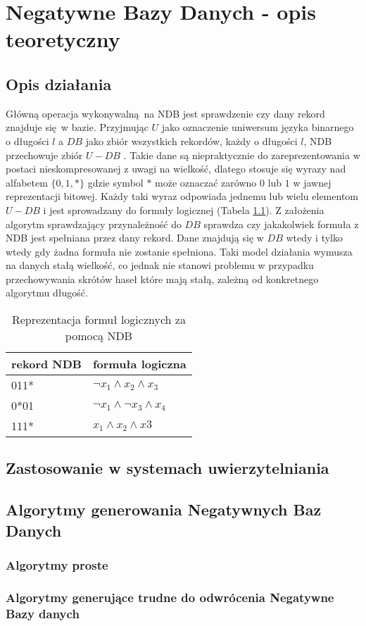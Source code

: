 \chapter{Negatywne Bazy Danych - opis teoretyczny}
\section{Opis działania}
Główną operacja wykonywalną na NDB jest sprawdzenie czy dany rekord znajduje się w bazie. Przyjmując $U$ 
jako oznaczenie uniwersum języka binarnego o długości $l$ a $DB$ jako zbiór wszystkich rekordów, każdy o długości $l$,
NDB przechowuje zbiór $U - DB$ \cite{NRI-Esponda}. Takie dane są niepraktycznie do zareprezentowania w postaci nieskompresowanej z uwagi na wielkość, dlatego
stosuje się wyrazy nad alfabetem $\{0,1,*\}$ gdzie symbol $*$ może oznaczać zarówno $0$ lub $1$ w jawnej reprezentacji bitowej.
Każdy taki wyraz odpowiada jednemu lub wielu elementom $U - DB$ i jest sprowadzany do formuły logicznej (Tabela \ref{Tbl:NDB-logform}).
Z założenia algorytm sprawdzający przynależność do $DB$ sprawdza czy jakakolwiek formuła z NDB jest spełniana przez dany rekord. 
Dane znajdują się w $DB$ wtedy i tylko wtedy gdy żadna formuła nie zostanie spełniona. Taki model działania wymusza na danych stałą wielkość,
co jednak nie stanowi problemu w przypadku przechowywania skrótów haseł które mają stałą, zależną od konkretnego algorytmu długość.

\begin{table}[h]
    \caption{Reprezentacja formuł logicznych za pomocą NDB}
    \centering
    \label{Tbl:NDB-logform}
    \begin{tabular}{|l|l|}
    	\hline
    	rekord NDB & formuła logiczna                       \\ \hline
    	011*       & $\neg{x_1} \land x_2 \land x_3$        \\ \hline
    	0*01       & $\neg{x_1} \land \neg{x_3} \land x_4 $ \\ \hline
    	111*       & $x_1 \land x_2 \land x3$               \\ \hline
    \end{tabular}
\end{table}

\section{Zastosowanie w systemach uwierzytelniania}

\section{Algorytmy generowania Negatywnych Baz Danych}
\subsection{Algorytmy proste}
\subsection{Algorytmy generujące trudne do odwrócenia Negatywne Bazy danych}
